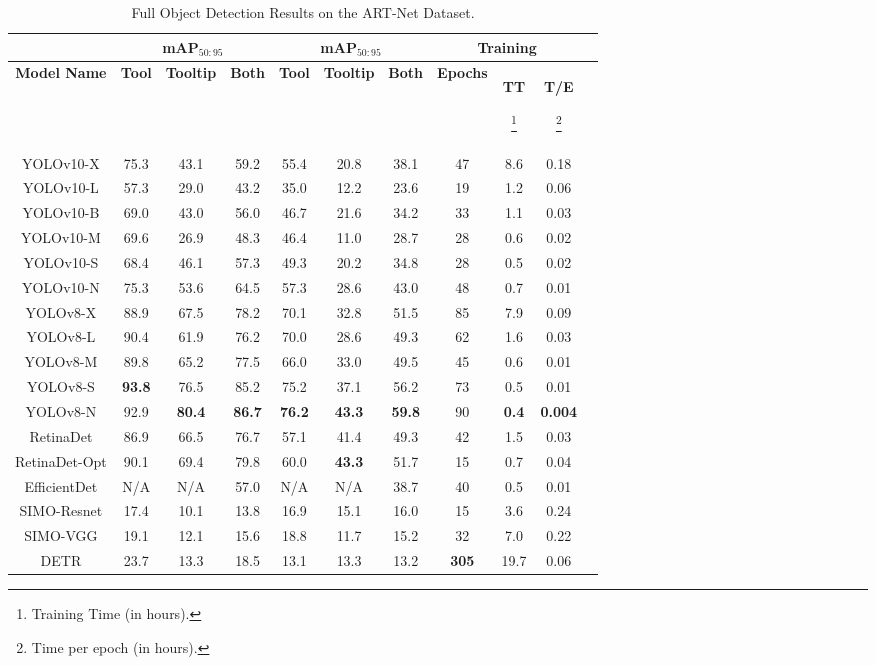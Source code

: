 \begin{table*}[h]
\centering
\caption{Full Object Detection Results on the ART-Net Dataset.}
\label{fig:artresults}
\begin{tabular}{|c|c|c|c|c|c|c|c|c|c|c|}
\hline
\multicolumn{1}{|c|}{} & \multicolumn{3}{c|}{\textbf{mAP$_{50:95}$}} & \multicolumn{3}{c|}{\textbf{mAP$_{50:95}$}} & \multicolumn{3}{c|}{\textbf{Training}} \\
\hline
\textbf{Model Name} & \textbf{Tool} & \textbf{Tooltip} & \textbf{Both} & \textbf{Tool} & \textbf{Tooltip} & \textbf{Both} & \textbf{Epochs} & \textbf{TT}\begin{scriptsize}\footnote{Training Time (in hours).}\end{scriptsize} & \textbf{T/E}\begin{scriptsize}\footnote{Time per epoch (in hours).}\end{scriptsize} \\ 
\hline
YOLOv10-X & 75.3 & 43.1 & 59.2 & 55.4 & 20.8 & 38.1 & 47 & 8.6 & 0.18 \\ 
YOLOv10-L & 57.3 & 29.0 & 43.2 & 35.0 & 12.2 & 23.6 & 19 & 1.2 & 0.06 \\ 
YOLOv10-B & 69.0 & 43.0 & 56.0 & 46.7 & 21.6 & 34.2 & 33 & 1.1 & 0.03 \\ 
YOLOv10-M & 69.6 & 26.9 & 48.3 & 46.4 & 11.0 & 28.7 & 28 & 0.6 & 0.02 \\ 
YOLOv10-S & 68.4 & 46.1 & 57.3 & 49.3 & 20.2 & 34.8 & 28 & 0.5 & 0.02 \\ 
YOLOv10-N & 75.3 & 53.6 & 64.5 & 57.3 & 28.6 & 43.0 & 48 & 0.7 & 0.01 \\ 
YOLOv8-X & 88.9 & 67.5 & 78.2 & 70.1 & 32.8 & 51.5 & 85 & 7.9 & 0.09 \\ 
YOLOv8-L & 90.4 & 61.9 & 76.2 & 70.0 & 28.6 & 49.3 & 62 & 1.6 & 0.03 \\ 
YOLOv8-M & 89.8 & 65.2 & 77.5 & 66.0 & 33.0 & 49.5 & 45 & 0.6 & 0.01 \\ 
YOLOv8-S & \textbf{93.8} & 76.5 & 85.2 & 75.2 & 37.1 & 56.2 & 73 & 0.5 & 0.01 \\ 
YOLOv8-N & 92.9 & \textbf{80.4} & \textbf{86.7} & \textbf{76.2} & \textbf{43.3} & \textbf{59.8} & 90 & \textbf{0.4} & \textbf{0.004} \\ 
RetinaDet & 86.9 & 66.5 & 76.7 & 57.1 & 41.4 & 49.3 & 42 & 1.5 & 0.03 \\ 
RetinaDet-Opt & 90.1 & 69.4 & 79.8 & 60.0 & \textbf{43.3} & 51.7 & 15 & 0.7 & 0.04 \\ 
EfficientDet & N/A & N/A & 57.0 & N/A & N/A & 38.7 & 40 & 0.5 & 0.01 \\ 
SIMO-Resnet & 17.4 & 10.1 & 13.8 & 16.9 & 15.1 & 16.0 & 15 & 3.6 & 0.24 \\ 
SIMO-VGG & 19.1 & 12.1 & 15.6 & 18.8 & 11.7 & 15.2 & 32 & 7.0 & 0.22 \\ 
DETR & 23.7 & 13.3 & 18.5 & 13.1 & 13.3 & 13.2 & \textbf{305} & 19.7 & 0.06 \\ 
\hline
\end{tabular}
\end{table*}

